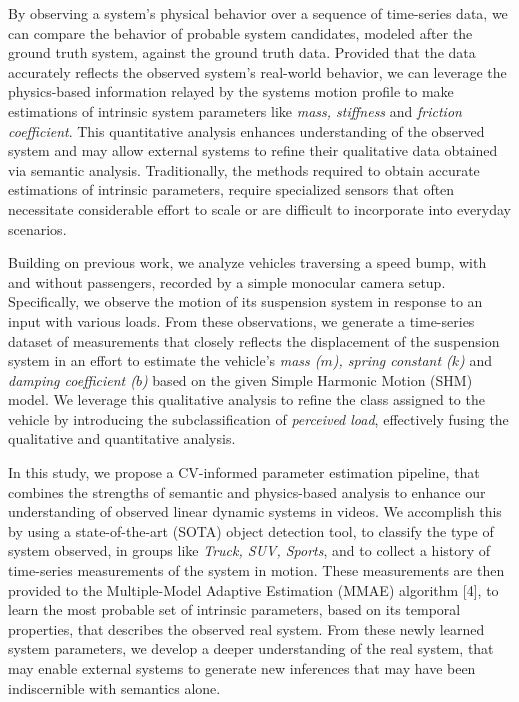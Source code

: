 \documentclass[letterpaper, 10 pt, conference]{ieeeconf}  %
\begin{document}
By observing a system's physical behavior over a sequence of time-series data, we can compare the behavior of probable system candidates, modeled after the ground truth system, against the ground truth data. Provided that the data accurately reflects the observed system's real-world behavior, we can leverage the physics-based information relayed by the systems motion profile to make estimations of intrinsic system parameters like \textit{mass, stiffness} and \textit{friction coefficient}. This quantitative analysis enhances understanding of the observed system and may allow external systems to refine their qualitative data obtained via semantic analysis. Traditionally, the methods required to obtain accurate estimations of intrinsic parameters, require specialized sensors that often necessitate considerable effort to scale or are difficult to incorporate into everyday scenarios. 

Building on previous work, we analyze vehicles traversing a speed bump, with and without passengers, recorded by a simple monocular camera setup. Specifically, we observe the motion of its suspension system in response to an input with various loads. From these observations, we generate a time-series dataset of measurements that closely reflects the displacement of the suspension system in an effort to estimate the vehicle's \textit{mass ($m$), spring constant ($k$)} and \textit{damping coefficient ($b$)} based on the given Simple Harmonic Motion (SHM) model. We leverage this qualitative analysis to refine the class assigned to the vehicle by introducing the subclassification of \textit{perceived load}, effectively fusing the qualitative and quantitative analysis.

In this study, we propose a CV-informed parameter estimation pipeline, that combines the strengths of semantic and physics-based analysis to enhance our understanding of observed linear dynamic systems in videos. We accomplish this by using a state-of-the-art (SOTA) object detection tool, to classify the type of system observed, in groups like \textit{Truck, SUV, Sports}, and to collect a history of time-series measurements of the system in motion. These measurements are then provided to the Multiple-Model Adaptive Estimation (MMAE) algorithm [4], to learn the most probable set of intrinsic parameters, based on its temporal properties, that describes the observed real system. From these newly learned system parameters, we develop a deeper understanding of the real system, that may enable external systems to generate new inferences that may have been indiscernible with semantics alone.
\end{document}
